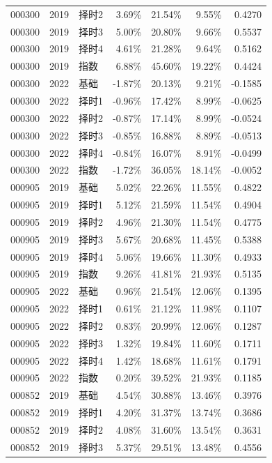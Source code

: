 \documentclass[UTF8,a4paper,11pt,fontset=fandol]{ctexart}
\begin{document}
\begin{longtable}{ll l rrrr}
000300 & 2019 & 择时2 & 3.69\% & 21.54\% & 9.55\% & 0.4270\\
000300 & 2019 & 择时3 & 5.00\% & 20.80\% & 9.66\% & 0.5537\\
000300 & 2019 & 择时4 & 4.61\% & 21.28\% & 9.64\% & 0.5162\\
000300 & 2019 & 指数 & 6.88\% & 45.60\% & 19.22\% & 0.4424\\
000300 & 2022 & 基础 & -1.87\% & 20.13\% & 9.21\% & -0.1585\\
000300 & 2022 & 择时1 & -0.96\% & 17.42\% & 8.99\% & -0.0625\\
000300 & 2022 & 择时2 & -0.87\% & 17.14\% & 8.99\% & -0.0524\\
000300 & 2022 & 择时3 & -0.85\% & 16.88\% & 8.89\% & -0.0513\\
000300 & 2022 & 择时4 & -0.84\% & 16.07\% & 8.91\% & -0.0499\\
000300 & 2022 & 指数 & -1.72\% & 36.05\% & 18.14\% & -0.0052\\\midrule
000905 & 2019 & 基础 & 5.02\% & 22.26\% & 11.55\% & 0.4822\\
000905 & 2019 & 择时1 & 5.12\% & 21.59\% & 11.54\% & 0.4904\\
000905 & 2019 & 择时2 & 4.96\% & 21.30\% & 11.54\% & 0.4775\\
000905 & 2019 & 择时3 & 5.67\% & 20.68\% & 11.45\% & 0.5388\\
000905 & 2019 & 择时4 & 5.06\% & 19.66\% & 11.30\% & 0.4933\\
000905 & 2019 & 指数 & 9.26\% & 41.81\% & 21.93\% & 0.5135\\
000905 & 2022 & 基础 & 0.96\% & 21.54\% & 12.06\% & 0.1395\\
000905 & 2022 & 择时1 & 0.61\% & 21.12\% & 11.98\% & 0.1107\\
000905 & 2022 & 择时2 & 0.83\% & 20.99\% & 12.06\% & 0.1287\\
000905 & 2022 & 择时3 & 1.32\% & 19.84\% & 11.60\% & 0.1711\\
000905 & 2022 & 择时4 & 1.42\% & 18.68\% & 11.61\% & 0.1791\\
000905 & 2022 & 指数 & 0.20\% & 39.52\% & 21.93\% & 0.1185\\\midrule
000852 & 2019 & 基础 & 4.54\% & 30.88\% & 13.46\% & 0.3976\\
000852 & 2019 & 择时1 & 4.20\% & 31.37\% & 13.74\% & 0.3686\\
000852 & 2019 & 择时2 & 4.08\% & 31.60\% & 13.54\% & 0.3631\\
000852 & 2019 & 择时3 & 5.37\% & 29.51\% & 13.48\% & 0.4556\\

\end{longtable}
\end{document}
